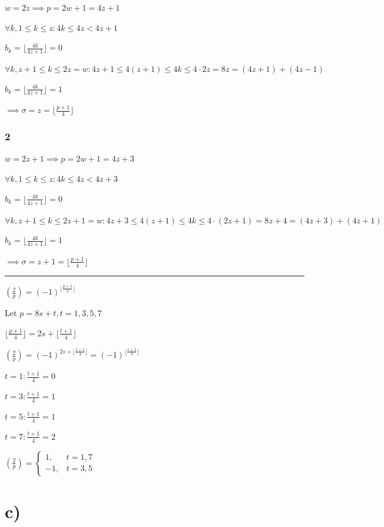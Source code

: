 \documentclass{article}
\begin{document}
\( w = 2z \implies p = 2w + 1 = 4z + 1 \)

\( \forall k, 1 \leq k \leq z:  4k \leq 4z < 4z + 1 \)

\( b_k = \lfloor{\frac{4k}{4z+1}}\rfloor = 0 \)

\( \forall k, z+1 \leq k \leq 2z = w: 4z + 1 \leq 4(z + 1) \leq 4k \leq 4\cdot2z = 8z = (4z + 1) + (4z-1) \)

\( b_k = \lfloor{\frac{4k}{4z+1}}\rfloor = 1 \)

\( \implies \sigma = z = \lfloor{\frac{p+1}{4}}\rfloor \)

\subsubsection*{2}

\( w = 2z+1 \implies p = 2w + 1 = 4z + 3 \)

\( \forall k, 1 \leq k \leq z:  4k \leq 4z < 4z + 3 \)

\( b_k = \lfloor{\frac{4k}{4z+1}}\rfloor = 0 \)

\( \forall k, z+1 \leq k \leq 2z + 1 = w: 4z + 3 \leq 4(z + 1) \leq 4k \leq 4\cdot(2z + 1) = 8z + 4 = (4z + 3) + (4z+1) \)

\( b_k = \lfloor{\frac{4k}{4z+1}}\rfloor = 1 \)

\( \implies \sigma = z + 1 = \lfloor{\frac{p+1}{4}}\rfloor \)

\bigskip\hrule\bigskip

\( (\frac{2}{p}) = (-1)^{\lfloor{\frac{p+1}{4}}\rfloor} \)

Let \( p = 8s + t, t = 1,3,5,7 \)

\( \lfloor \frac{p+1}{4}\rfloor = 2s + \lfloor{\frac{t+1}{4}} \rfloor \)

\( (\frac{2}{p}) = (-1)^{2s + \lfloor{\frac{t+1}{4}} \rfloor} = (-1)^{\lfloor{\frac{t+1}{4}} \rfloor} \)

\( t = 1: \frac{t+1}{4} = 0 \)

\( t = 3: \frac{t+1}{4} = 1 \)

\( t = 5: \frac{t+1}{4} = 1 \)

\( t = 7: \frac{t+1}{4} = 2 \)

\( (\frac{2}{p})= \left\{\begin{matrix}1, & t=1,7\\-1, &t=3,5\end{matrix}\right. \)

\section*{c)}
\end{document}
